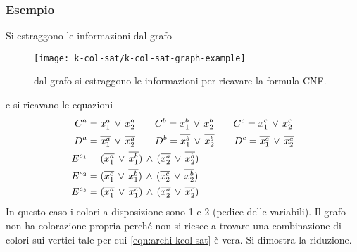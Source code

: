 \subsubsection{Esempio}
Si estraggono le informazioni dal grafo
\begin{figure}[thbp]
	\centering
	\texttt{[image: k-col-sat/k-col-sat-graph-example]}
	\caption{dal grafo si estraggono le informazioni per ricavare la formula CNF.}
	\label{fig:k-col-sat-graph-example}
\end{figure}
e si ricavano le equazioni
\begin{align*}
	C^a&=x_1^a\,\vee\, x_2^a \qquad  C^b=x_1^b\,\vee\, x_2^b \qquad C^c=x_1^c\,\vee\, x_2^c\\
	D^a&=\overline{x_1^a}\,\vee\, \overline{x_2^a} \qquad D^b = \overline{x_1^b}\,\vee\,\overline{x_2^b} \qquad D^c=\overline{x_1^c}\,\vee\,\overline{x_2^c}\\
	E^{e_1}&=(\overline{x_1^a}\,\vee\,\overline{x_1^b})\,\wedge\,(\overline{x_2^a}\,\vee\,\overline{x_2^b})\\E^{e_2}&=(\overline{x_1^c}\,\vee\,\overline{x_1^b})\,\wedge\,(\overline{x_2^c}\,\vee\,\overline{x_2^b})\\E^{e_3}&=(\overline{x_1^a}\,\vee\,\overline{x_1^c})\,\wedge\,(\overline{x_2^a}\,\vee\,\overline{x_2^c})
\end{align*}
In questo caso i colori a disposizione sono 1 e 2 (pedice delle variabili). Il grafo non ha colorazione propria perché non si riesce a trovare una combinazione di colori sui vertici tale per cui \cref{eqn:archi-kcol-sat} è vera.
Si dimostra la riduzione.
